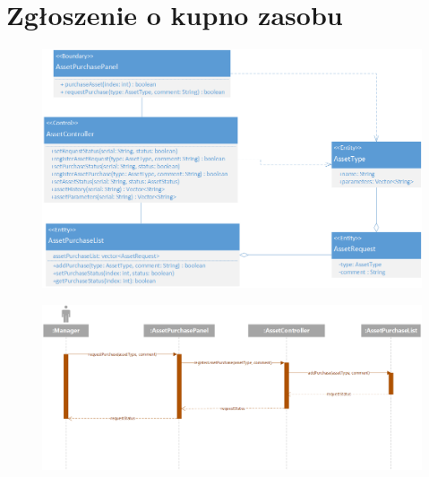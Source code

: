 \documentclass[11pt, a4paper, oneside]{report}
\begin{document}
\section{Zgłoszenie o kupno zasobu}
\begin{figure}[H]
\centering
\includegraphics[scale=0.5]{zgloszenie_kupno_zasob_class.png}
\end{figure}
\begin{figure}[H]
\centering
\includegraphics[scale=0.5]{zgloszenie_kupno_zasob_sequence.png}
\end{figure}
\end{document}
